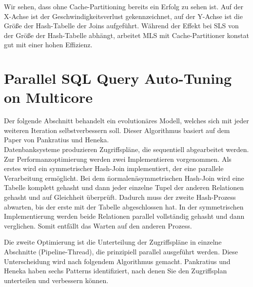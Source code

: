 Wir sehen, dass ohne Cache-Partitioning bereits ein Erfolg zu sehen ist. Auf der X-Achse ist der Geschwindigkeitsverlust gekennzeichnet, auf der Y-Achse ist die Größe der Hash-Tabelle der Joins aufgeführt. Während der Effekt bei SLS von der Größe der Hash-Tabelle abhängt, arbeitet MLS mit Cache-Partitioner konstat gut mit einer hohen Effizienz.

\section{Parallel SQL Query Auto-Tuning on Multicore}
\label{sec:Parallel-SQL-Query-Auto-Tuning}
Der folgende Abschnitt behandelt ein evolutionäres Modell, welches sich mit jeder weiteren Iteration selbstverbessern soll. Dieser Algorithmus basiert auf dem Paper von Pankratius und Heneka.\\

Datenbanksysteme produzieren Zugriffspläne, die sequentiell abgearbeitet werden. Zur Performanzoptimierung werden zwei Implementieren vorgenommen. Als erstes wird ein symmetrischer Hash-Join implementiert, der eine parallele Verarbeitung ermöglicht. Bei dem \"normalen\" asymmetrischen Hash-Join wird eine Tabelle komplett gehasht und dann jeder einzelne Tupel der anderen Relationen gehasht und auf Gleichheit überprüft. Dadurch muss der zweite Hash-Prozess abwarten, bis der erste mit der Tabelle abgeschlossen hat. In der symmetrischen Implementierung werden beide Relationen parallel vollständig gehasht und dann verglichen. Somit entfällt das Warten auf den anderen Prozess.

Die zweite Optimierung ist die Unterteilung der Zugriffspläne in einzelne Abschnitte (Pipeline-Thread), die prinzipiell parallel ausgeführt werden. Diese Unterscheidung wird nach folgendem Algorithmus gemacht. Pankratius und Heneka haben sechs Patterns identifiziert, nach denen Sie den Zugriffsplan unterteilen und verbessern können.

